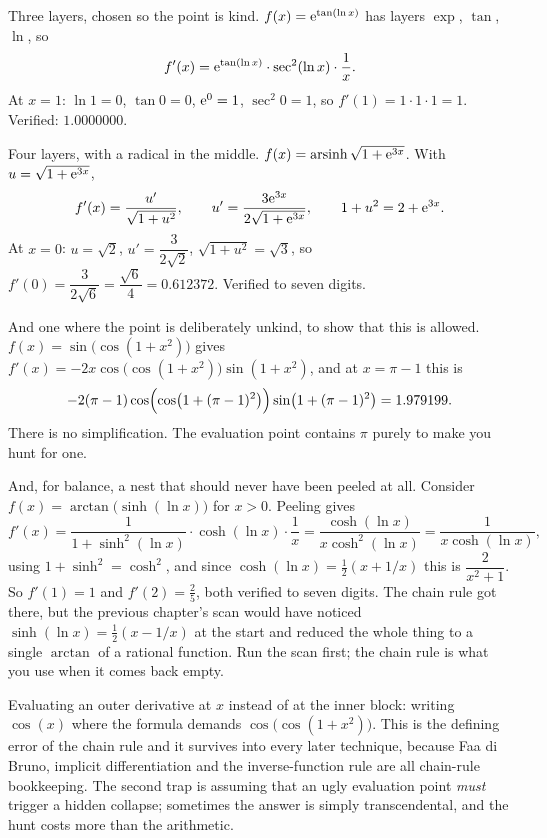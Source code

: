 \begin{worked}
Three layers, chosen so the point is kind. $f(x)=\mathrm{e}^{\tan(\ln x)}$ has layers $\exp$, $\tan$, $\ln$, so
\[
f'(x)=\mathrm{e}^{\tan(\ln x)}\cdot\sec^{2}(\ln x)\cdot\frac1x .
\]
At $x=1$: $\ln1=0$, $\tan0=0$, $\mathrm{e}^{0}=1$, $\sec^{2}0=1$, so $f'(1)=1\cdot1\cdot1=1$. Verified: $1.0000000$.

Four layers, with a radical in the middle. $f(x)=\operatorname{arsinh}\sqrt{1+\mathrm{e}^{3x}}$. With $u=\sqrt{1+\mathrm{e}^{3x}}$,
\[
f'(x)=\frac{u'}{\sqrt{1+u^{2}}},\qquad u'=\frac{3\mathrm{e}^{3x}}{2\sqrt{1+\mathrm{e}^{3x}}},\qquad 1+u^{2}=2+\mathrm{e}^{3x}.
\]
At $x=0$: $u=\sqrt2$, $u'=\dfrac{3}{2\sqrt2}$, $\sqrt{1+u^{2}}=\sqrt3$, so $f'(0)=\dfrac{3}{2\sqrt6}=\dfrac{\sqrt6}{4}=0.612372$. Verified to seven digits.

And one where the point is deliberately unkind, to show that this is allowed. $f(x)=\sin\bigl(\cos(1+x^{2})\bigr)$ gives $f'(x)=-2x\cos\bigl(\cos(1+x^{2})\bigr)\sin(1+x^{2})$, and at $x=\pi-1$ this is
\[
-2(\pi-1)\cos\Bigl(\cos\bigl(1+(\pi-1)^{2}\bigr)\Bigr)\sin\bigl(1+(\pi-1)^{2}\bigr)=1.979199 .
\]
There is no simplification. The evaluation point contains $\pi$ purely to make you hunt for one.

And, for balance, a nest that should never have been peeled at all. Consider $f(x)=\arctan\bigl(\sinh(\ln x)\bigr)$ for $x>0$. Peeling gives
\[
f'(x)=\frac{1}{1+\sinh^{2}(\ln x)}\cdot\cosh(\ln x)\cdot\frac1x=\frac{\cosh(\ln x)}{x\cosh^{2}(\ln x)}=\frac{1}{x\cosh(\ln x)},
\]
using $1+\sinh^{2}=\cosh^{2}$, and since $\cosh(\ln x)=\tfrac12(x+1/x)$ this is $\dfrac{2}{x^{2}+1}$. So $f'(1)=1$ and $f'(2)=\tfrac25$, both verified to seven digits. The chain rule got there, but the previous chapter's scan would have noticed $\sinh(\ln x)=\tfrac12(x-1/x)$ at the start and reduced the whole thing to a single $\arctan$ of a rational function. Run the scan first; the chain rule is what you use when it comes back empty.
\end{worked}

\begin{trap}
Evaluating an outer derivative at $x$ instead of at the inner block: writing $\cos(x)$ where the formula demands $\cos\bigl(\cos(1+x^{2})\bigr)$. This is the defining error of the chain rule and it survives into every later technique, because Faa di Bruno, implicit differentiation and the inverse-function rule are all chain-rule bookkeeping. The second trap is assuming that an ugly evaluation point \emph{must} trigger a hidden collapse; sometimes the answer is simply transcendental, and the hunt costs more than the arithmetic.
\end{trap}

